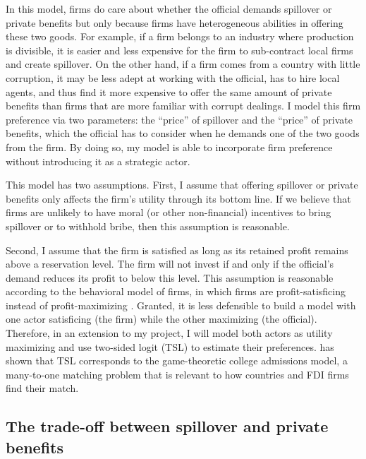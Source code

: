 In this model, firms do care about whether the official demands spillover or private benefits but only because firms have heterogeneous abilities in offering these two goods. For example, if a firm belongs to an industry where production is divisible, it is easier and less expensive for the firm to sub-contract local firms and create spillover. On the other hand, if a firm comes from a country with little corruption, it may be less adept at working with the official, has to hire local agents, and thus find it more expensive to offer the same amount of private benefits than firms that are more familiar with corrupt dealings. I model this firm preference via two parameters: the ``price'' of spillover and the ``price'' of private benefits, which the official has to consider when he demands one of the two goods from the firm. By doing so, my model is able to incorporate firm preference without introducing it as a strategic actor.

This model has two assumptions. First, I assume that offering spillover or private benefits only affects the firm's utility through its bottom line. If we believe that firms are unlikely to have moral (or other non-financial) incentives to bring spillover or to withhold bribe, then this assumption is reasonable. 

Second, I assume that the firm is satisfied as long as its retained profit remains above a reservation level. The firm will not invest if and only if the official's demand reduces its profit to below this level. This assumption is reasonable according to the behavioral model of firms, in which firms are profit-satisficing instead of profit-maximizing \citep{Simon1959}. Granted, it is less defensible to build a model with one actor satisficing (the firm) while the other maximizing (the official). Therefore, in an extension to my project, I will model both actors as utility maximizing and use two-sided logit (TSL) to estimate their preferences. \citet{Logan1996a} has shown that TSL corresponds to the game-theoretic college admissions model, a many-to-one matching problem that is relevant to how countries and FDI firms find their match.


\subsection{The trade-off between spillover and private benefits}
\label{sec:theory_tradeoff}

